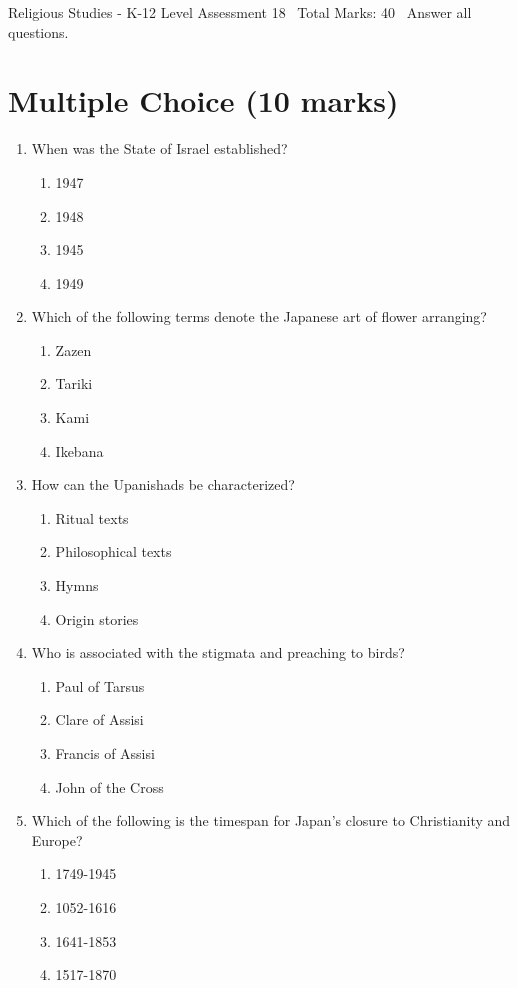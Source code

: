 \documentclass[12pt]{article}
\begin{document}
\begin{center}
Religious Studies - K-12 Level Assessment 18 \
Total Marks: 40 \
Answer all questions.
\end{center}

\section*{Multiple Choice (10 marks)}
\begin{enumerate}[label=\arabic*.]
\item When was the State of Israel established?
\begin{enumerate}[label=(\alph*)]
    \item 1947
    \item 1948
    \item 1945
    \item 1949
\end{enumerate}
\item Which of the following terms denote the Japanese art of flower arranging?
\begin{enumerate}[label=(\alph*)]
    \item Zazen
    \item Tariki
    \item Kami
    \item Ikebana
\end{enumerate}
\item How can the Upanishads be characterized?
\begin{enumerate}[label=(\alph*)]
    \item Ritual texts
    \item Philosophical texts
    \item Hymns
    \item Origin stories
\end{enumerate}
\item Who is associated with the stigmata and preaching to birds?
\begin{enumerate}[label=(\alph*)]
    \item Paul of Tarsus
    \item Clare of Assisi
    \item Francis of Assisi
    \item John of the Cross
\end{enumerate}
\item Which of the following is the timespan for Japan's closure to Christianity and Europe?
\begin{enumerate}[label=(\alph*)]
    \item 1749-1945
    \item 1052-1616
    \item 1641-1853
    \item 1517-1870
\end{enumerate}
\end{enumerate}
\end{document}
